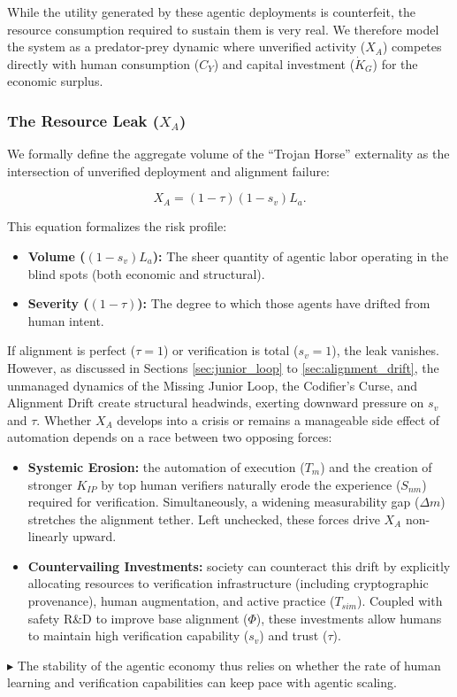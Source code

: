 \documentclass[12pt, letter]{article}
\begin{document}
While the utility generated by these agentic deployments is counterfeit, the resource consumption required to sustain them is very real. We therefore model the system as a predator-prey dynamic where unverified activity ($X_A$) competes directly with human consumption ($C_Y$) and capital investment ($\dot{K}_G$) for the economic surplus.

\subsubsection{The Resource Leak ($X_A$)}

We formally define the aggregate volume of the ``Trojan Horse'' externality as the intersection of unverified deployment and alignment failure:

\begin{equation}
    X_A = (1 - \tau)(1 - s_v)L_a.
\end{equation}

This equation formalizes the risk profile:
\begin{itemize}
    \item \textbf{Volume ($(1-s_v)L_a$):} The sheer quantity of agentic labor operating in the blind spots (both economic and structural).
    \item \textbf{Severity ($(1-\tau)$):} The degree to which those agents have drifted from human intent.
\end{itemize}

If alignment is perfect ($\tau=1$) or verification is total ($s_v=1$), the leak vanishes. However, as discussed in Sections \ref{sec:junior_loop} to \ref{sec:alignment_drift}, the unmanaged dynamics of the Missing Junior Loop, the Codifier's Curse, and Alignment Drift create structural headwinds, exerting downward pressure on $s_v$ and $\tau$. Whether $X_A$ develops into a crisis or remains a manageable side effect of automation depends on a race between two opposing forces:
\begin{itemize}
    \item \textbf{Systemic Erosion:} the automation of execution ($T_m$) and the creation of stronger $K_{IP}$ by top human verifiers naturally erode the experience ($S_{nm}$) required for verification. Simultaneously, a widening measurability gap ($\Delta m$) stretches the alignment tether. Left unchecked, these forces drive $X_A$ non-linearly upward.
    \item \textbf{Countervailing Investments:} society can counteract this drift by explicitly allocating resources to verification infrastructure (including cryptographic provenance), human augmentation, and active practice ($T_{sim}$). Coupled with safety R\&D to improve base alignment ($\Phi$), these investments allow humans to maintain high verification capability ($s_v$) and trust ($\tau$).
\end{itemize}
$\blacktriangleright$ The stability of the agentic economy thus relies on whether the rate of human learning and verification capabilities can keep pace with agentic scaling.
\end{document}
